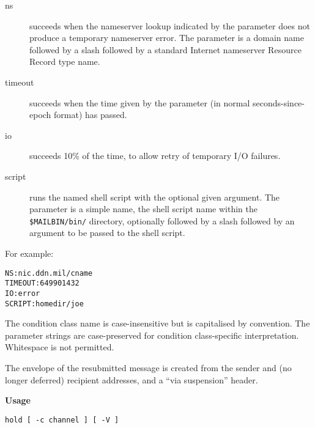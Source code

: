 \begin{description}
\item[ns] \mbox{}

succeeds when the nameserver lookup indicated by
the parameter does not produce a temporary nameserver 
error. The parameter is a domain name followed by a slash 
followed by a standard Internet
nameserver Resource Record type name.



\item[timeout] \mbox{}

succeeds when the time given by the parameter (in
normal seconds-since-epoch format) has passed.



\item[io] \mbox{}

succeeds 10\% of the time, to allow retry of temporary I/O failures.



\item[script] \mbox{}

runs the named shell script with the optional given
argument. The parameter is a simple name, the
shell script name within the {\tt \$MAILBIN/bin/} directory,
optionally followed by a slash followed by an argument to be 
passed to the shell script.

\end{description}


For example:

\begin{tscreen}
\begin{verbatim}
NS:nic.ddn.mil/cname
TIMEOUT:649901432
IO:error
SCRIPT:homedir/joe
\end{verbatim}
\end{tscreen}


The condition class name is case-insensitive but is 
capitalised by convention. The parameter strings are 
case-preserved for condition class-specific interpretation.
Whitespace is not permitted.

The envelope of the resubmitted message is created from
the sender and (no longer deferred) recipient addresses,
and a ``via suspension'' header.

{\bf Usage}

\begin{tscreen}
\begin{verbatim}
hold [ -c channel ] [ -V ]
\end{verbatim}
\end{tscreen}


